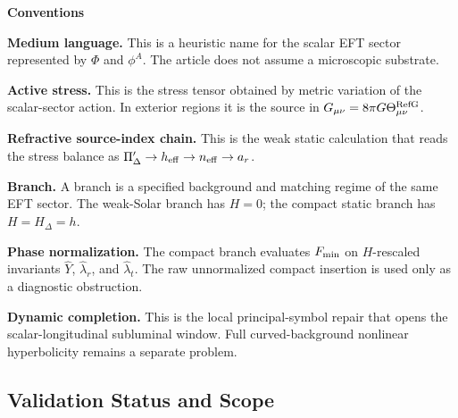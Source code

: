 \documentclass[12pt,a4paper]{article}
\begin{document}
\noindent\textbf{Conventions}\par\smallskip
\begin{list}{}{\setlength{\leftmargin}{0pt}\setlength{\itemindent}{0pt}\setlength{\labelwidth}{0pt}\setlength{\labelsep}{0pt}\setlength{\itemsep}{0pt}\setlength{\parsep}{0pt}\setlength{\parskip}{0pt}\setlength{\topsep}{0pt}\setlength{\partopsep}{0pt}}
\item \textbf{Medium language.} This is a heuristic name for the scalar EFT
sector represented by $\Phi$ and $\phi^A$. The article does not assume a
microscopic substrate.
\item \textbf{Active stress.} This is the stress tensor obtained by metric
variation of the scalar-sector action. In exterior regions it is the source in
$G_{\mu\nu}=8\pi G\Theta_{\mu\nu}^{\rm RefG}$.
\item \textbf{Refractive source-index chain.} This is the weak static calculation
that reads the stress balance as
$\Pi_\Delta'\to h_{\rm eff}\to n_{\rm eff}\to a_r$.
\item \textbf{Branch.} A branch is a specified background and matching regime of
the same EFT sector. The weak-Solar branch has $H=0$; the compact static branch
has $H=H_\Delta=h$.
\item \textbf{Phase normalization.} The compact branch evaluates $F_{\rm min}$ on
$H$-rescaled invariants $\widehat Y$, $\widehat\lambda_r$, and
$\widehat\lambda_t$. The raw unnormalized compact insertion is used only as a
diagnostic obstruction.
\item \textbf{Dynamic completion.} This is the local principal-symbol repair that
opens the scalar-longitudinal subluminal window. Full curved-background
nonlinear hyperbolicity remains a separate problem.
\end{list}

\subsection*{Validation Status and Scope}
\end{document}

